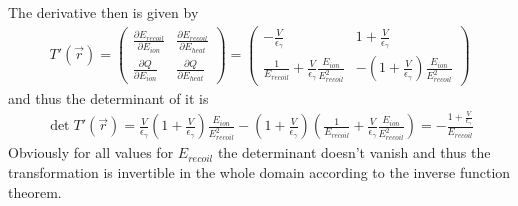\documentclass[10pt, a4paper]{article}
\begin{document}
The derivative then is given by
\begin{gather}
T'(\vec{r}) = \begin{pmatrix} \frac{\partial E_{recoil}}{\partial E_{ion}} & \frac{\partial E_{recoil}}{\partial E_{heat}} \\ \frac{\partial Q}{\partial E_{ion}} & \frac{\partial Q}{\partial E_{heat}} \end{pmatrix}
= \begin{pmatrix} - \frac{V}{\epsilon_\gamma} & 1 + \frac{V}{\epsilon_\gamma} \\ \frac{1}{E_{recoil}} + \frac{V}{\epsilon_\gamma} \frac{E_{ion}}{E_{recoil}^2} & - \left( 1 + \frac{V}{\epsilon_\gamma} \right) \frac{E_{ion}}{E_{recoil}^2} \end{pmatrix}
\end{gather}
and thus the determinant of it is
\begin{gather}
\det T'(\vec{r}) =  \frac{V}{\epsilon_\gamma} \left( 1 + \frac{V}{\epsilon_\gamma} \right) \frac{E_{ion}}{E_{recoil}^2} - \left(1 + \frac{V}{\epsilon_\gamma}\right) \left( \frac{1}{E_{recoil}} + \frac{V}{\epsilon_\gamma} \frac{E_{ion}}{E_{recoil}^2} \right) = - \frac{1 + \frac{V}{\epsilon_\gamma}}{E_{recoil}}
\end{gather}
Obviously for all values for $E_{recoil}$ the determinant doesn't vanish and thus the transformation is invertible in the whole domain according to the inverse function theorem.
\end{document}
